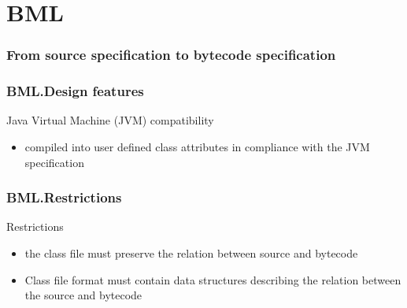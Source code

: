 \documentclass{beamer}
\begin{document}
\section{BML}
\begin{frame}[shrink]\frametitle{From source specification to bytecode specification}
\begin{center}
\end{center}
\end{frame}

  \begin{frame}\frametitle{BML.Design features}
     \item Java Virtual Machine (JVM) compatibility 
       \begin{itemize}
	      \item compiled into user defined class attributes 
		 in compliance with the JVM specification
	  \end{itemize}     
\end{frame} 

\begin{frame}\frametitle{BML.Restrictions}
Restrictions
   \begin{itemize} 
       \item the class file must preserve the relation between source and bytecode 
	 
	  
       \item Class file format must contain data structures describing the relation between 
	    the source and bytecode      
   \end{itemize}
 \end{frame}

\end{document}
